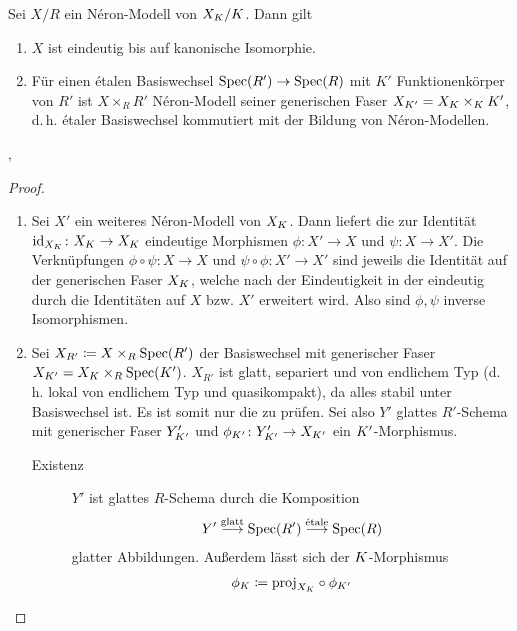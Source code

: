 \documentclass[german]{scrreprt}
\begin{document}
\begin{Satz}
  Sei $X/R$ ein Néron-Modell von $X_{K}/K$. Dann gilt
  \begin{enumerate}[label=(\roman*)]
  \item $X$ ist eindeutig bis auf kanonische Isomorphie.
  \item Für einen étalen Basiswechsel $\operatorname{Spec}(R')\to\operatorname{Spec}(R)$ mit $K'$
    Funktionenkörper von $R'$ ist $X\times_R R'$ Néron-Modell
    seiner generischen Faser $X_{K'}=X_{K}\times_{K}K'$,
    d.\,h. étaler Basiswechsel kommutiert mit der Bildung von
    Néron-Modellen.
  \end{enumerate}
  \cite[1.2, Proposition 2]{neron},
  \cite[vgl.][Proposition IV.5.2]{silverman2}
  \begin{proof}
    \begin{enumerate}[label=(\roman*)]
    \item Sei $X'$ ein weiteres Néron-Modell von $X_{K}$.
      Dann liefert die \NAbbEig zur Identität
      $\mathrm{id}_{X_{K}}\colon X_{K}\to X_{K}$ eindeutige Morphismen
      $\phi\colon X'\to X$ und $\psi\colon X\to X'$.
      Die Verknüpfungen $\phi\circ\psi\colon X\to X$ und
      $\psi\circ\phi\colon X'\to X'$ sind jeweils die Identität auf
      der generischen Faser $X_{K}$, welche nach der Eindeutigkeit in der
      \NAbbEig eindeutig durch die Identitäten auf
      $X$ bzw. $X'$ erweitert wird. Also sind $\phi,\psi$ inverse
      Isomorphismen.
    \item
      Sei $X_{R'}\coloneqq X\times_R \operatorname{Spec}(R')$ der Basiswechsel
      mit generischer Faser $X_{K'}=X_{K}\times_R\operatorname{Spec}(K')$. $X_{R'}$
      ist glatt, separiert und von endlichem Typ 
      (d.\,h. lokal von endlichem Typ und quasikompakt), da alles
      stabil unter Basiswechsel ist. Es ist somit nur die
      \NAbbEig zu prüfen.
      Sei also $Y'$ glattes $R'$-Schema mit generischer Faser
      $Y_{K'}'$ und $\phi_{K'}\colon Y_{K'}'\to X_{K'}$ ein
      $K'$-Morphismus. 
      \begin{description}
      \item[Existenz] 
        $Y'$ ist glattes $R$-Schema durch die Komposition
        \begin{gather*}
          Y'\overset{\text{glatt}}{\longrightarrow}\operatorname{Spec}(R')
          \overset{\text{étale}}{\longrightarrow}\operatorname{Spec}(R)
        \end{gather*}
        glatter Abbildungen.
        Außerdem lässt sich der $K$-Morphismus
        \begin{gather*}
          \phi_{\K} \coloneqq \proj_{X_\K}\circ\phi_{\K'}

\end{gather*}
\end{description}
\end{enumerate}
\end{proof}
\end{Satz}
\end{document}
